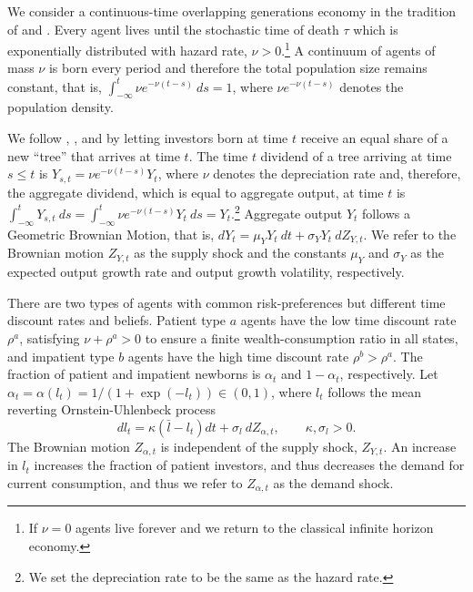 \documentclass[preprint,11pt,authoryear]{elsarticle}
\theoremstyle{plain}
\begin{document}
We consider a continuous-time overlapping generations economy in the tradition of \cite{Blanchard2013} and \cite{Garleanu2008}.  Every agent lives until the stochastic time of death $\tau$ which is exponentially distributed with hazard rate, $\nu > 0$.\footnote{If $\nu=0$ agents live forever and we return to the classical infinite horizon economy.}  A continuum of agents of mass $\nu$ is born every period and therefore the total population size remains constant, that is, $\int^{t}_{-\infty}\nu e^{-\nu\left(t-s\right)}  \: ds = 1$, where $\nu e^{-\nu\left(t-s\right)}$ denotes the population density.  

We follow \cite{GarlenauKoganPanageas2012}, \cite{panageas:2020}, and \cite{GPG:2021} by letting investors born at time $t$ receive an equal share of a new ``tree'' that arrives at time $t$. The time $t$ dividend of a tree arriving at time $s \leq t$ is $Y_{s,t} = \nu e^{-\nu\left(t-s\right)}Y_t$, 
where $\nu$ denotes the depreciation rate and, therefore, the aggregate dividend, which is equal to aggregate output, at time $t$ is $\int^{t}_{-\infty}Y_{s,t} \: ds = \int^{t}_{-\infty}\nu e^{-\nu\left(t-s\right)}Y_t \: ds = Y_t.$\footnote{We set the depreciation rate to be the same as the hazard rate.} Aggregate output $Y_t$ follows a Geometric Brownian Motion, that is, $dY_{t} = \mu_{Y} Y_{t} \: dt + \sigma_{Y} Y_{t} \: dZ_{Y,t}$.
We refer to the Brownian motion $Z_{Y,t}$ as the supply shock and the constants $\mu_Y$ and $\sigma_Y$ as the expected output growth rate and output growth volatility, respectively. 

There are two types of agents with common risk-preferences but different time discount rates and beliefs. Patient type $a$ agents have the low time discount rate $\rho^a$, satisfying $\nu + \rho^a>0$ to ensure a finite wealth-consumption ratio in all states, and impatient type $b$ agents have the high time discount rate $\rho^b > \rho^a$.  The fraction of patient and impatient newborns is $\alpha_t$ and $1-\alpha_t$, respectively. Let $\alpha_t = \alpha(l_t) = 1/(1+\exp(-l_t))\in \left(0,1\right)$, where $l_t$ follows the mean reverting Ornstein-Uhlenbeck process
\begin{equation}\label{l_dynamics}
	dl_t = \kappa \left(\bar{l} - l_t\right)dt + \sigma_{l}\: dZ_{\alpha,t}, \qquad \kappa, \sigma_l >0.
\end{equation}
The Brownian motion $Z_{\alpha,t}$ is independent of the supply shock, $Z_{Y,t}$. An increase in $l_t$ increases the fraction of patient investors, and thus decreases the demand for current consumption, and thus we refer to $Z_{\alpha,t}$ as the demand shock. %
\end{document}
